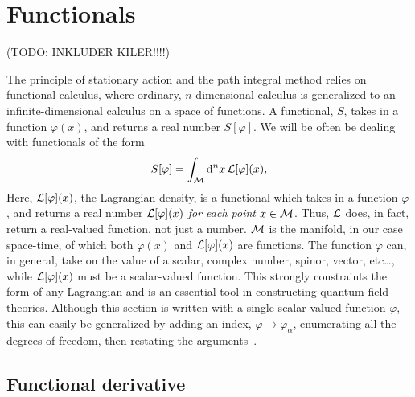 \section{Functionals}
\label{appendix: Functional derivatives}
(TODO: INKLUDER KILER!!!!)

The principle of stationary action and the path integral method relies on functional calculus, where ordinary, $n$-dimensional calculus is generalized to an infinite-dimensional calculus on a space of functions.
A functional, $S$, takes in a function $\varphi(x)$, and returns a real number $S[\varphi]$.
We will be often be dealing with functionals of the form
%
\begin{equation}
    \label{general action functional}
    S[\varphi] = \int_{\mathcal{M}} \dd^n x \, \mathcal{L}[\varphi](x),
\end{equation}
%
Here, $\mathcal{L}[\varphi](x)$, the Lagrangian density, is a functional which takes in a function $\varphi$, and returns a real number $\mathcal{L}[\varphi](x)$ \emph{for each point} $x \in \mathcal{M}$.
Thus, $\mathcal{L}$ does, in fact, return a real-valued function, not just a number.
$\mathcal{M}$ is the manifold, in our case space-time, of which both $\varphi(x)$ and $\mathcal{L}[\varphi](x)$ are functions.
The function $\varphi$ can, in general, take on the value of a scalar, complex number, spinor, vector, etc\dots, while $\mathcal{L}[\varphi](x)$ must be a scalar-valued function.
This strongly constraints the form of any Lagrangian and is an essential tool in constructing quantum field theories.
Although this section is written with a single scalar-valued function $\varphi$, this can easily be generalized by adding an index, $\varphi \rightarrow \varphi_\alpha$, enumerating all the degrees of freedom, then restating the arguments~\autocite{carrollSpacetimeGeometryIntroduction2019,schwartzQuantumFieldTheory2013}.


\subsection{Functional derivative}

